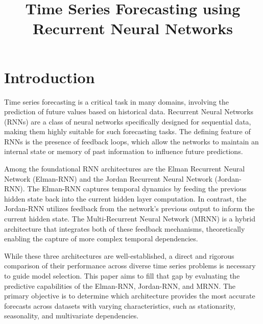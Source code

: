 \documentclass[conference, 10pt]{IEEEtran}
\begin{document}
\title{Time Series Forecasting using Recurrent Neural Networks}

\author{
}

\maketitle

\begin{abstract}

\end{abstract}

\begin{IEEEkeywords}

\end{IEEEkeywords}

\section{Introduction}

Time series forecasting is a critical task in many domains, involving the prediction of future values based on
historical data. Recurrent Neural Networks (RNNs) are a class of neural networks specifically designed for sequential
data, making them highly suitable for such forecasting tasks. The defining feature of RNNs is the presence of feedback
loops, which allow the networks to maintain an internal state or memory of past information to influence future
predictions.

Among the foundational RNN architectures are the Elman Recurrent Neural Network (Elman-RNN) and the Jordan Recurrent
Neural Network (Jordan-RNN). The Elman-RNN captures temporal dynamics by feeding the previous hidden state back into the
current hidden layer computation. In contrast, the Jordan-RNN utilizes feedback from the network's previous output to
inform the current hidden state. The Multi-Recurrent Neural Network (MRNN) is a hybrid architecture that integrates both
of these feedback mechanisms, theoretically enabling the capture of more complex temporal dependencies.

While these three architectures are well-established, a direct and rigorous comparison of their performance across
diverse time series problems is necessary to guide model selection. This paper aims to fill that gap by evaluating the
predictive capabilities of the Elman-RNN, Jordan-RNN, and MRNN. The primary objective is to determine which architecture
provides the most accurate forecasts across datasets with varying characteristics, such as stationarity, seasonality,
and multivariate dependencies.
\end{document}
